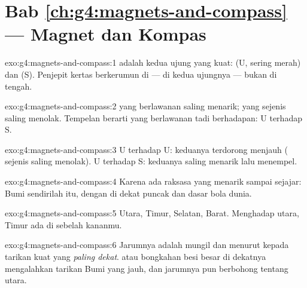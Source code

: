 \section*{Bab \ref{ch:g4:magnets-and-compass} --- Magnet dan Kompas}

\begin{solution}{exo:g4:magnets-and-compass:1}
 adalah kedua ujung  yang kuat:  (U, sering
merah) dan  (S). Penjepit kertas berkerumun di 
--- di kedua ujungnya --- bukan di tengah.
\end{solution}

\begin{solution}{exo:g4:magnets-and-compass:2}
 yang berlawanan saling menarik;  yang sejenis saling
menolak. Tempelan berarti  yang berlawanan tadi berhadapan: U
terhadap S.
\end{solution}

\begin{solution}{exo:g4:magnets-and-compass:3}
U terhadap U: keduanya terdorong menjauh ( sejenis saling
menolak). U terhadap S: keduanya saling menarik lalu menempel.
\end{solution}

\begin{solution}{exo:g4:magnets-and-compass:4}
Karena ada  raksasa yang menarik  sampai sejajar: Bumi
sendirilah  itu, dengan   di dekat puncak dan
dasar bola dunia.
\end{solution}

\begin{solution}{exo:g4:magnets-and-compass:5}
Utara, Timur, Selatan, Barat. Menghadap utara, Timur ada di sebelah kananmu.
\end{solution}

\begin{solution}{exo:g4:magnets-and-compass:6}
Jarumnya adalah  mungil dan menurut kepada tarikan kuat yang
\emph{paling dekat}.  atau bongkahan besi besar di dekatnya
mengalahkan tarikan  Bumi yang jauh, dan jarumnya pun berbohong
tentang utara.
\end{solution}

